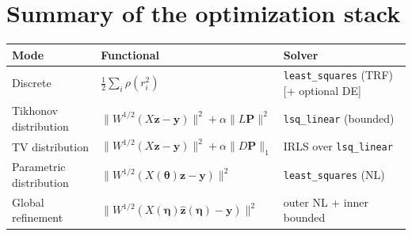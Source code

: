 \documentclass[11pt,a4paper]{article}
\newcommand{\code}[1]{\texttt{\small #1}}
\begin{document}
\section{Summary of the optimization stack}
\begin{center}
\begin{tabular}{@{}lll@{}}
\toprule
\textbf{Mode} & \textbf{Functional} & \textbf{Solver}\\
\midrule
Discrete & $\tfrac12\sum_i\rho(r_i^2)$ & \code{least\_squares} (TRF) [+ optional DE]\\
Tikhonov distribution & $\|W^{1/2}(X\bm z-\bm y)\|^2+\alpha\|L\bm P\|^2$ & \code{lsq\_linear} (bounded)\\
TV distribution & $\|W^{1/2}(X\bm z-\bm y)\|^2+\alpha\|D\bm P\|_1$ & IRLS over \code{lsq\_linear}\\
Parametric distribution & $\|W^{1/2}(X(\bm\theta)\bm z-\bm y)\|^2$ & \code{least\_squares} (NL)\\
Global refinement & $\|W^{1/2}(X(\bm\eta)\hat{\bm z}(\bm\eta)-\bm y)\|^2$ & outer NL + inner bounded\\
\bottomrule
\end{tabular}
\end{center}
\end{document}
